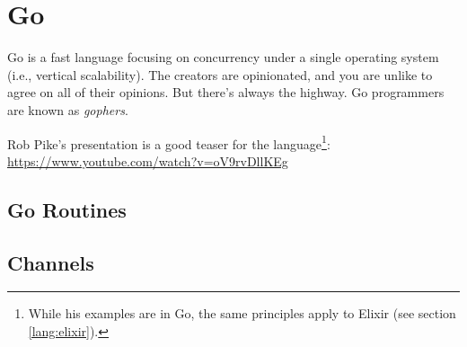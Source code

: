 \section{Go}

 Go is a fast language focusing on concurrency under a single operating system (i.e., vertical scalability). The creators are opinionated, and you are unlike to agree on all of their opinions. But there's always the highway. Go programmers are known as \textsl{gophers}.

Rob Pike's  presentation is a good teaser for the language\footnote{While his examples are in Go, the same principles apply to Elixir (see section \ref{lang:elixir}).}: \url{https://www.youtube.com/watch?v=oV9rvDllKEg}

\subsection{Go Routines}
\subsection{Channels}

